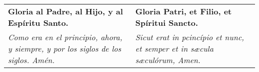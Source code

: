 \documentclass[../devocionario.tex]{subfiles}
\begin{document}
    \begin{longtable} { p{} p{} }
        \textbf{Gloria al Padre, al Hijo, y al Espíritu Santo.} &
        \textbf{Gloria Patri, et Filio, et Spíritui Sancto.}\\
        
        \textit{Como era en el principio, ahora, y siempre, y por los siglos de los siglos. Amén.} &
        \textit{Sicut erat in pcincípio et nunc, et semper et in sæcula sæculórum, Amen.}
    \end{longtable}
\end{document}
